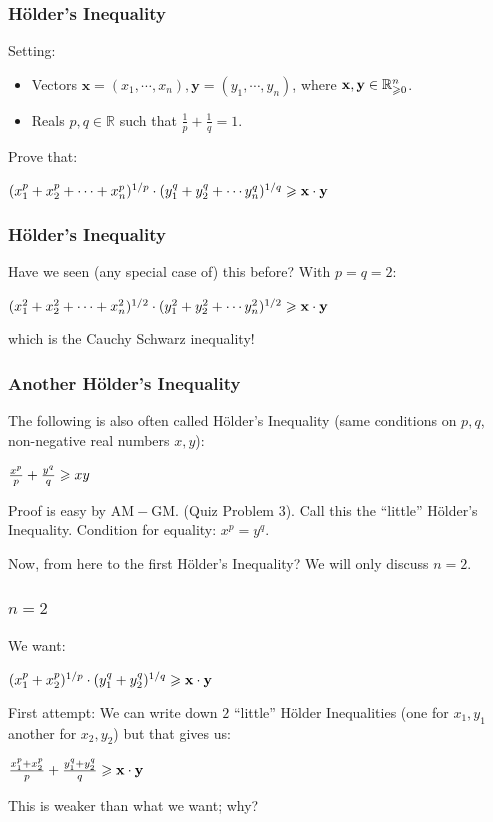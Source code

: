 \documentclass{beamer}
\begin{document}
\begin{frame} 
\frametitle{H\"{o}lder's Inequality}
Setting: 
\begin{itemize}
\item
Vectors $\mathbf{x}= (x_1, \cdots, x_n), \mathbf{y} = (y_1, \cdots, y_n)$, where
$\mathbf{x}, \mathbf{y} \in \mathbb{R}^{n}_{\geqslant 0}$.
\item Reals $p, q \in \mathbb{R}$ such that $\frac{1}{p} + \frac{1}{q} = 1$. 
\end{itemize}
Prove that:
\begin{center}
$(x_1^p + x_2^p + \cdots + x_n^p)^{1/p} \cdot (y_1^q + y_2^q + \cdots y_n^q)^{1/q} \geqslant \mathbf{x}\cdot\mathbf{y}$
\end{center}
\end{frame}

\begin{frame}
\frametitle{H\"{o}lder's Inequality}
Have we seen (any special case of) this before?
With $p = q = 2$: 
\begin{center}
$(x_1^2 + x_2^2 + \cdots + x_n^2)^{1/2} \cdot (y_1^2 + y_2^2 + \cdots y_n^2)^{1/2} \geqslant \mathbf{x}\cdot\mathbf{y}$
\end{center}
which is the Cauchy Schwarz inequality!
\end{frame}

\begin{frame}
\frametitle{Another H\"{o}lder's Inequality}
The following is also often called H\"{o}lder's Inequality (same conditions on $p, q$, non-negative
real numbers $x, y$):
\begin{center}
$\frac{x^p}{p} + \frac{y^q}{q} \geqslant x y$
\end{center}
Proof is easy by $\mathrm{AM-GM}$. (Quiz Problem $3$). 
Call this the ``little'' H\"{o}lder's Inequality.
Condition for equality: $x^p = y^q$.

Now, from here to the first H\"{o}lder's Inequality? We will only discuss $n = 2$. 
\end{frame}

\begin{frame}
\frametitle{$n = 2$}
We want: 
\begin{center}
$(x_1^p + x_2^p)^{1/p}\cdot (y_1^q + y_2^q)^{1/q} \geqslant \mathbf{x}\cdot \mathbf{y}$
\end{center}
First attempt: 
We can write down $2$ ``little'' H\"{o}lder Inequalities (one for $x_1, y_1$ another for $x_2, y_2$)
but that gives us:
\begin{center}
$\frac{x_1^p + x_2^p}{p}+\frac{y_1^q + y_2^q}{q} \geqslant \mathbf{x}\cdot \mathbf{y}$
\end{center}
This is {\color{red} weaker} than what we want; why?
\end{frame}
\end{document}
